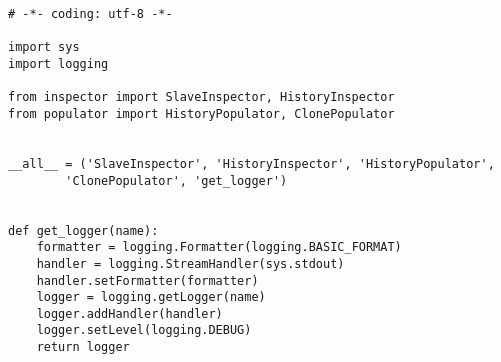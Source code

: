 \begin{lstlisting}[caption={utils/\_\_init\_\_.py}]
# -*- coding: utf-8 -*-

import sys
import logging

from inspector import SlaveInspector, HistoryInspector
from populator import HistoryPopulator, ClonePopulator


__all__ = ('SlaveInspector', 'HistoryInspector', 'HistoryPopulator',
        'ClonePopulator', 'get_logger')


def get_logger(name):
    formatter = logging.Formatter(logging.BASIC_FORMAT)
    handler = logging.StreamHandler(sys.stdout)
    handler.setFormatter(formatter)
    logger = logging.getLogger(name)
    logger.addHandler(handler)
    logger.setLevel(logging.DEBUG)
    return logger
\end{lstlisting}